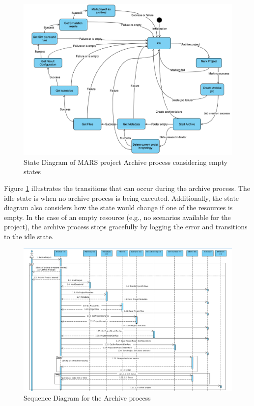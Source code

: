 \begin{figure}[H]
    \centering \includegraphics[scale=0.45]{grafiken/stateArchive.png}
    \caption{State Diagram of MARS project Archive process considering empty states}
    \label{fig:stateArchive}
\end{figure}

Figure \ref{fig:stateArchive} illustrates the transitions that can occur during the archive process. The idle state is when no archive process
is being executed. Additionally, the state diagram also considers
how the state would change if one of the resources is empty. In the case of an empty resource (e.g., no scenarios available for the project), the archive
process stops gracefully by logging the error and transitions to the idle state. 

\begin{figure}[H]
    \centering \includegraphics[scale=0.5, angle=90, origin=c]{grafiken/sequenceArchive.png}
    \caption{Sequence Diagram for the Archive process}
    \label{fig:sequenceArchive}
\end{figure}

